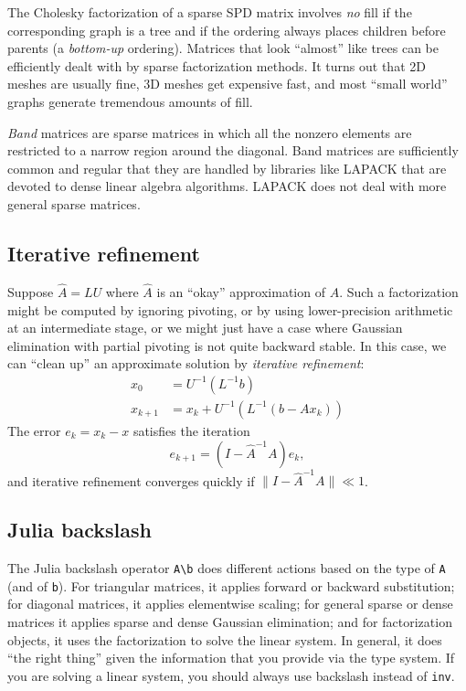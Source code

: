 \documentclass[12pt, leqno]{article}
\begin{document}
The Cholesky factorization of a sparse SPD matrix involves {\em no}
fill if the corresponding graph is a tree and if the ordering
always places children before parents (a {\em bottom-up} ordering).
Matrices that look ``almost'' like trees can be efficiently dealt
with by sparse factorization methods.  It turns out that 2D meshes
are usually fine, 3D meshes get expensive fast, and most ``small
world'' graphs generate tremendous amounts of fill.

{\em Band} matrices are sparse matrices in which all the nonzero
elements are restricted to a narrow region around the diagonal.
Band matrices are sufficiently common and regular that they are
handled by libraries like LAPACK that are devoted to dense linear
algebra algorithms.  LAPACK does not deal with more general sparse
matrices.

\subsection{Iterative refinement}

Suppose $\hat{A} = LU$ where $\hat{A}$ is an ``okay'' approximation
of $A$.  Such a factorization might be computed by ignoring pivoting,
or by using lower-precision arithmetic at an intermediate stage,
or we might just have a case where Gaussian elimination with partial
pivoting is not quite backward stable.  In this case, we can ``clean
up'' an approximate solution by {\em iterative refinement}:
\begin{align*}
x_0 &= U^{-1} (L^{-1} b) \\
x_{k+1} &= x_k + U^{-1} (L^{-1} (b-Ax_k))
\end{align*}
The error $e_k = x_k-x$ satisfies the iteration
\[
  e_{k+1} = (I-\hat{A}^{-1} A) e_k,
\]
and iterative refinement converges quickly if
$\|I-\hat{A}^{-1} A\| \ll 1$.

\subsection{Julia backslash}

The Julia backslash operator \verb|A\b| does different actions based
on the type of {\tt A} (and of {\tt b}).  For triangular matrices, it
applies forward or backward substitution; for diagonal matrices, it
applies elementwise scaling; for general sparse or dense matrices it
applies sparse and dense Gaussian elimination; and for factorization
objects, it uses the factorization to solve the linear system.  In
general, it does ``the right thing'' given the information that you
provide via the type system.  If you are solving a linear system, you
should always use backslash instead of {\tt inv}.
\end{document}
